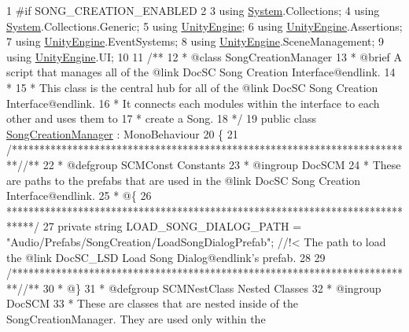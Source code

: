 \begin{DoxyCodeInclude}
1 \textcolor{preprocessor}{#if SONG\_CREATION\_ENABLED}
2 
3 \textcolor{keyword}{using} \hyperlink{namespace_system}{System}.Collections;
4 \textcolor{keyword}{using} \hyperlink{namespace_system}{System}.Collections.Generic;
5 \textcolor{keyword}{using} \hyperlink{namespace_unity_engine}{UnityEngine};
6 \textcolor{keyword}{using} \hyperlink{namespace_unity_engine}{UnityEngine}.Assertions;
7 \textcolor{keyword}{using} \hyperlink{namespace_unity_engine}{UnityEngine}.EventSystems;
8 \textcolor{keyword}{using} \hyperlink{namespace_unity_engine}{UnityEngine}.SceneManagement;
9 \textcolor{keyword}{using} \hyperlink{namespace_unity_engine}{UnityEngine}.UI;
10 \textcolor{comment}{}
11 \textcolor{comment}{/**}
12 \textcolor{comment}{ * @class SongCreationManager}
13 \textcolor{comment}{ * @brief A script that manages all of the @link DocSC Song Creation Interface@endlink.}
14 \textcolor{comment}{ * }
15 \textcolor{comment}{ * This class is the central hub for all of the @link DocSC Song Creation Interface@endlink.}
16 \textcolor{comment}{ * It connects each modules within the interface to each other and uses them to }
17 \textcolor{comment}{ * create a Song.}
18 \textcolor{comment}{*/}
19 \textcolor{keyword}{public} \textcolor{keyword}{class }\hyperlink{class_song_creation_manager}{SongCreationManager} : MonoBehaviour
20 \{
21     \textcolor{comment}{/*************************************************************************/}\textcolor{comment}{/** }
22 \textcolor{comment}{    * @defgroup SCMConst Constants}
23 \textcolor{comment}{    * @ingroup DocSCM}
24 \textcolor{comment}{    * These are paths to the prefabs that are used in the @link DocSC Song Creation Interface@endlink.}
25 \textcolor{comment}{    * @\{}
26 \textcolor{comment}{    *****************************************************************************/}
27     \textcolor{keyword}{private} \textcolor{keywordtype}{string} LOAD\_SONG\_DIALOG\_PATH = \textcolor{stringliteral}{"Audio/Prefabs/SongCreation/LoadSongDialogPrefab"}; \textcolor{comment}{//!< The path
       to load the @link DocSC\_LSD Load Song Dialog@endlink's prefab.}
28 \textcolor{comment}{}
29     \textcolor{comment}{/*************************************************************************/}\textcolor{comment}{/** }
30 \textcolor{comment}{    * @\}}
31 \textcolor{comment}{    * @defgroup SCMNestClass Nested Classes}
32 \textcolor{comment}{    * @ingroup DocSCM}
33 \textcolor{comment}{    * These are classes that are nested inside of the SongCreationManager. They are used only within the
}
\end{DoxyCodeInclude}
